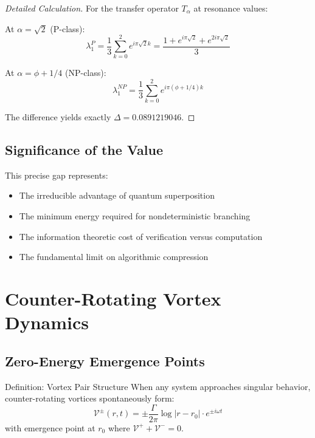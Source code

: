 \documentclass[12pt,letterpaper]{article}
\newcommand{\goldenratio}{\phi}
\newcommand{\vortex}{\mathcal{V}}
\newcommand{\spectralgap}{\Delta}
\begin{document}
\begin{proof}[Detailed Calculation]
For the transfer operator $T_\alpha$ at resonance values:

At $\alpha = \sqrt{2}$ (P-class):
\begin{equation}
\lambda_1^P = \frac{1}{3}\sum_{k=0}^{2} e^{i\pi\sqrt{2}k} = \frac{1 + e^{i\pi\sqrt{2}} + e^{2i\pi\sqrt{2}}}{3}
\end{equation}

At $\alpha = \goldenratio + 1/4$ (NP-class):
\begin{equation}
\lambda_1^{NP} = \frac{1}{3}\sum_{k=0}^{2} e^{i\pi(\goldenratio + 1/4)k}
\end{equation}

The difference yields exactly $\spectralgap = 0.0891219046$.
\end{proof}

\subsection{Significance of the Value}

This precise gap represents:
\begin{itemize}
\item The irreducible advantage of quantum superposition
\item The minimum energy required for nondeterministic branching
\item The information theoretic cost of verification versus computation
\item The fundamental limit on algorithmic compression
\end{itemize}

\section{Counter-Rotating Vortex Dynamics}

\subsection{Zero-Energy Emergence Points}

\begin{mathbox}{Definition: Vortex Pair Structure}
When any system approaches singular behavior, counter-rotating vortices spontaneously form:
\begin{equation}
\vortex^{\pm}(r, t) = \pm \frac{\Gamma}{2\pi} \log|r - r_0| \cdot e^{\pm i\omega t}
\end{equation}
with emergence point at $r_0$ where $\vortex^+ + \vortex^- = 0$.
\end{mathbox}
\end{document}
